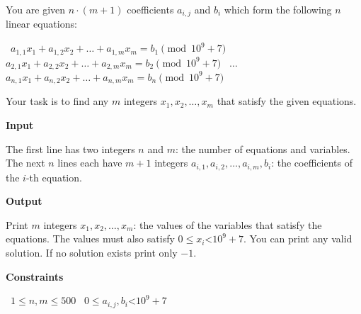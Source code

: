 You are given $n\cdot(m+1)$ coefficients $a_{i,j}$ and $b_i$ which form the following $n$ linear equations:

\textbullet\ $a_{1,1}x_1 + a_{1,2}x_2 + \dots + a_{1,m}x_m = b_1 \pmod {10^9 + 7}$
\textbullet\ $a_{2,1}x_1 + a_{2,2}x_2 + \dots + a_{2,m}x_m = b_2 \pmod {10^9 + 7}$
\textbullet\ $\dots$
\textbullet\ $a_{n,1}x_1 + a_{n,2}x_2 + \dots + a_{n,m}x_m = b_n \pmod {10^9 + 7}$

Your task is to find any $m$ integers $x_1, x_2, \dots, x_m$  that satisfy the given equations.

\vspace{0.3cm}\noindent\textbf{Input}

The first line has two integers $n$ and $m$: the number of equations and variables.
The next $n$ lines each have $m+1$ integers $a_{i,1}, a_{i,2}, \dots, a_{i,m}, b_i$: the coefficients of the $i$-th equation.

\vspace{0.3cm}\noindent\textbf{Output}

Print $m$ integers $x_1, x_2,\dots, x_m$: the values of the variables that satisfy the equations. The values must also satisfy $0 \le x_i $<$ 10^9 + 7$. You can print any valid solution. If no solution exists print only $-1$.

\vspace{0.3cm}\noindent\textbf{Constraints}

\textbullet\ $1 \le n, m \le 500$
\textbullet\ $0 \le a_{i,j}, b_i $<$ 10^9 + 7$
